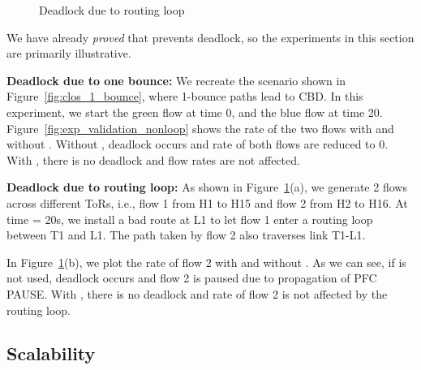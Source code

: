 \begin{figure}[t]
	\centering
	
	
	\caption{Deadlock due to routing loop}\label{fig:exp_validation_loop}
	
\end{figure}

We have already {\em proved} that \sysname{} prevents deadlock, so the
experiments in this section are primarily illustrative. 

\textbf{Deadlock due to one bounce:} We recreate the scenario shown in
Figure~\ref{fig:clos_1_bounce}, where 1-bounce paths lead to CBD.  In this
experiment, we start the green flow at time 0, and the blue flow at time 20.
Figure~\ref{fig:exp_validation_nonloop} shows the rate of the two flows with and
without \sysname{}.  Without \sysname{}, deadlock occurs and rate of both flows
are reduced to 0. With \sysname{}, there is no deadlock and flow rates are not
affected.

\textbf{Deadlock due to routing loop:} As shown in
Figure~\ref{fig:exp_validation_loop}(a), we generate 2 flows across different
ToRs, i.e., flow 1 from H1 to H15 and flow 2 from H2 to H16. At time = 20s, we
install a bad route at L1 to let flow 1 enter a routing loop between T1 and L1.
The path taken by flow 2 also traverses link T1-L1. 

In Figure~\ref{fig:exp_validation_loop}(b), we plot the rate of flow 2 with and
without \sysname{}. As we can see, if \sysname{} is not used, deadlock occurs
and flow 2 is paused due to propagation of PFC PAUSE. With \sysname{}, there is
no deadlock and rate of flow 2 is not affected by the routing loop.

\subsection{Scalability}
\label{subsec:exp_overhead}

